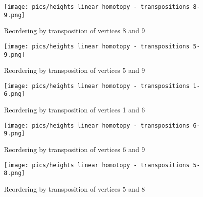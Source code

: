 \documentclass{article}
\begin{document}
\begin{figure}[htbp]
    \centering
    \texttt{[image: pics/heights linear homotopy - transpositions 8-9.png]}
    \caption{Reordering by transposition of vertices 8 and 9}
    \label{fig:transposition8and9}
\end{figure}
\begin{figure}[htbp]
    \centering
    \texttt{[image: pics/heights linear homotopy - transpositions 5-9.png]}
    \caption{Reordering by transposition of vertices 5 and 9}
    \label{fig:transposition5and9}
\end{figure}
\begin{figure}[htbp]
    \centering
    \texttt{[image: pics/heights linear homotopy - transpositions 1-6.png]}
    \caption{Reordering by transposition of vertices 1 and 6}
    \label{fig:transposition1and6}
\end{figure}
\begin{figure}[htbp]
    \centering
    \texttt{[image: pics/heights linear homotopy - transpositions 6-9.png]}
    \caption{Reordering by transposition of vertices 6 and 9}
    \label{fig:transposition6and9}
\end{figure}
\begin{figure}[htbp]
    \centering
    \texttt{[image: pics/heights linear homotopy - transpositions 5-8.png]}
    \caption{Reordering by transposition of vertices 5 and 8}
    \label{fig:transposition5and8}
\end{figure}
\end{document}
